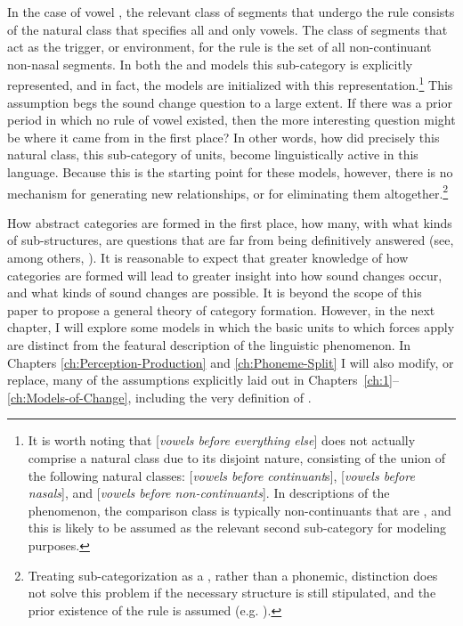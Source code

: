 In the case of vowel , the relevant class of segments that
undergo the rule consists of the natural class that specifies all
and only vowels. The class of segments that act as the trigger, or
environment, for the rule is the set of all non-continuant non-nasal
 segments. In both the  and  models
this sub-category is explicitly represented, and in fact, the models
are initialized with this representation.\footnote{It is worth noting that {[}\emph{vowels before everything else}{]}
does not actually comprise a natural class due to its disjoint nature,
consisting of the union of the following natural classes: {[}\emph{vowels
before continuant}s{]}, {[}\emph{vowels before nasals}{]}, and {[}\emph{vowels
before  non-continuants}{]}. In descriptions of the phenomenon,
the comparison class is typically non-continuants that are ,
and this is likely to be assumed as the relevant second sub-category
for modeling purposes.} This assumption begs the sound change question to a large extent.
If there was a prior period in which no rule of vowel 
existed, then the more interesting question might be where it came
from in the first place? In other words, how did precisely this natural
class, this sub-category of  units, become linguistically
active in this language. Because this is the starting point for
these models, however, there is no mechanism for generating new 
relationships, or for eliminating them altogether.\footnote{Treating sub-categorization as a , rather than a phonemic,
distinction does not solve this problem if the necessary structure
is still stipulated, and the prior existence of the  rule
is assumed (e.g. \citealp{dillon2013single}).}\largerpage[-3]

How abstract categories are formed in the first place, how many,
with what kinds of sub-structures, are questions that are far from
being definitively answered (see, among others, \citealt{Peperkamp2006,dillon2013single,feldman2009learning,mcmurray2011information,goldsmith2009learning}).
It is reasonable to expect that greater knowledge of how categories
are formed will lead to greater insight into how sound changes occur,
and what kinds of sound changes are possible. It is beyond the scope
of this paper to propose a general theory of category formation. However,
in the next chapter, I will explore some models in which the basic
units to which forces apply are distinct from the featural description
of the linguistic phenomenon. In Chapters \ref{ch:Perception-Production}
and \ref{ch:Phoneme-Split} I will also modify, or replace, many
of the assumptions explicitly laid out in Chapters~\ref{ch:1}--\ref{ch:Models-of-Change},
including the very definition of .
